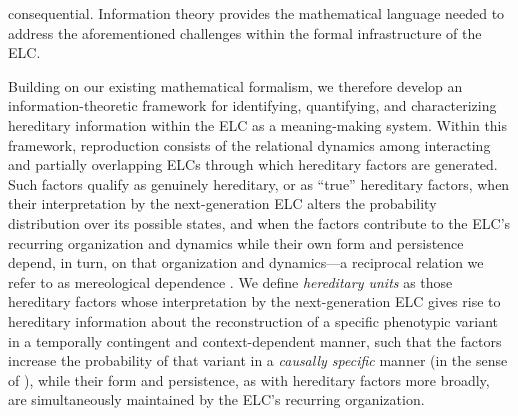 \documentclass[pdflatex,sn-mathphys-num]{sn-jnl}
\theoremstyle{thmstylethree}
\theoremstyle{thmstyleone}
\begin{document}
consequential. Information theory provides the mathematical language needed to address the aforementioned challenges within the formal infrastructure of the ELC.

Building on our existing mathematical formalism, we therefore develop an information-theoretic framework for identifying, quantifying, and characterizing hereditary information within the ELC as a meaning-making system. Within this framework, reproduction consists of the relational dynamics among interacting and partially overlapping ELCs through which hereditary factors are generated. Such factors qualify as genuinely hereditary, or as “true” hereditary factors, when their interpretation by the next-generation ELC alters the probability distribution over its possible states, and when the factors contribute to the ELC's recurring organization and dynamics while their own form and persistence depend, in turn, on that organization and dynamics—a reciprocal relation we refer to as mereological dependence \cite{mediano2022greater, barad2007meeting}. We define \textit{hereditary units} as those hereditary factors whose interpretation by the next-generation ELC gives rise to hereditary information about the reconstruction of a specific phenotypic variant in a temporally contingent and context-dependent manner, such that the factors increase the probability of that variant in a \textit{causally specific} manner (in the sense of \cite{griffiths2017genetic}), while their form and persistence, as with hereditary factors more broadly, are simultaneously maintained by the ELC’s recurring organization. %
\end{document}
